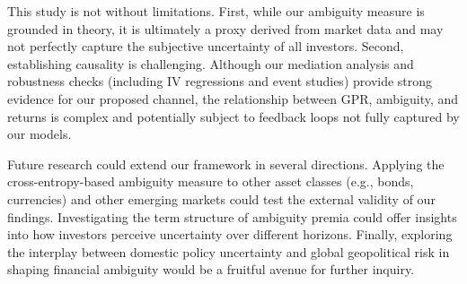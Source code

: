 \documentclass[preprint,12pt,authoryear]{elsarticle}
\begin{document}
This study is not without limitations. First, while our ambiguity measure is grounded in theory, it is ultimately a proxy derived from market data and may not perfectly capture the subjective uncertainty of all investors. Second, establishing causality is challenging. Although our mediation analysis and robustness checks (including IV regressions and event studies) provide strong evidence for our proposed channel, the relationship between GPR, ambiguity, and returns is complex and potentially subject to feedback loops not fully captured by our models.

Future research could extend our framework in several directions. Applying the cross-entropy-based ambiguity measure to other asset classes (e.g., bonds, currencies) and other emerging markets could test the external validity of our findings. Investigating the term structure of ambiguity premia could offer insights into how investors perceive uncertainty over different horizons. Finally, exploring the interplay between domestic policy uncertainty and global geopolitical risk in shaping financial ambiguity would be a fruitful avenue for further inquiry.



\end{document}
